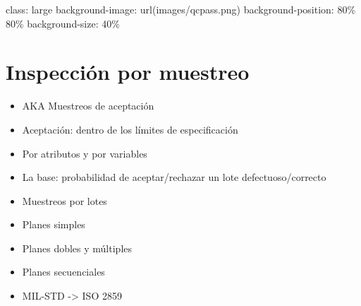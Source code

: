 \documentclass[
]{book}
\begin{document}
class: large
background-image: url(images/qcpass.png)
background-position: 80\% 80\%
background-size: 40\%

\hypertarget{inspecciuxf3n-por-muestreo}{%
\section{Inspección por muestreo}\label{inspecciuxf3n-por-muestreo}}

\begin{itemize}
\item
  AKA Muestreos de aceptación
\item
  Aceptación: dentro de los límites de especificación
\item
  Por atributos y por variables
\item
  La base: probabilidad de aceptar/rechazar un lote defectuoso/correcto
\item
  Muestreos por lotes
\item
  Planes simples
\item
  Planes dobles y múltiples
\item
  Planes secuenciales
\item
  MIL-STD -\textgreater{} ISO 2859
\end{itemize}
\end{document}
